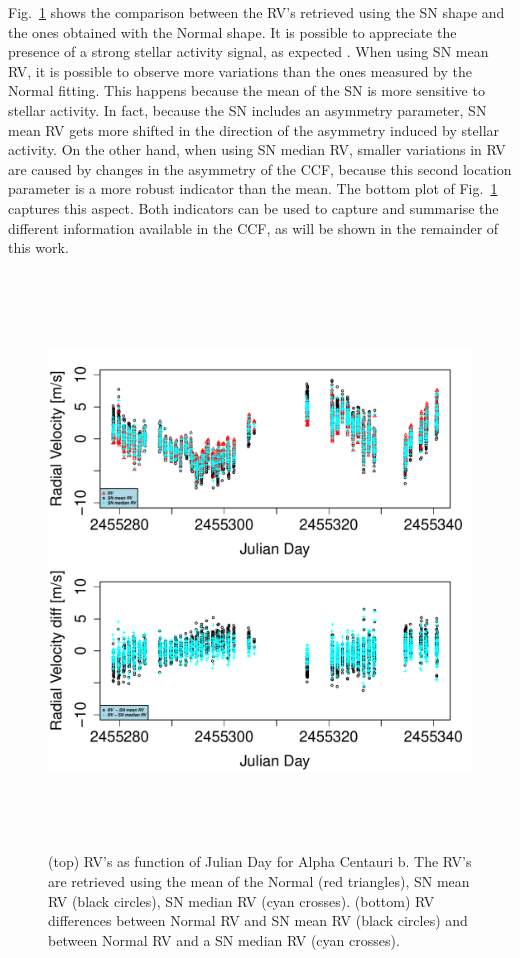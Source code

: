 \documentclass[11pt, oneside]{article}
\begin{document}
Fig.~\ref{fig:alphacent:diff:RV} shows the comparison between the RV's retrieved using the SN shape and the ones obtained with the Normal shape. It is possible to appreciate the presence of a strong stellar activity signal, as expected \citep{Dumusque-2012,Thompson-2017}. When using SN mean RV, it is possible to observe more variations than the ones measured by the Normal fitting. This happens because the mean of the SN is more sensitive to stellar activity. In fact, because the SN includes an asymmetry parameter, SN mean RV gets more shifted in the direction of the asymmetry induced by stellar activity. On the other hand, when using SN median RV, smaller variations in RV are caused by changes in the asymmetry of the CCF, because this second location parameter is a more robust indicator than the mean. The bottom plot of Fig.~\ref{fig:alphacent:diff:RV} captures this aspect. Both indicators can be used to capture and summarise the different information available in the CCF, as will be shown in the remainder of this work.
%
\begin{figure}[htbp]
   \centering
\includegraphics[height = 6in]{HD12862_[2]RadialVelocityDifferences.pdf} 
   \caption{(top) RV's as function of Julian Day for Alpha Centauri b. The RV's are retrieved using the mean of the Normal (red triangles), SN mean RV (black circles), SN median RV (cyan crosses). (bottom) RV differences between Normal RV and SN mean RV (black circles) and between Normal RV and a SN median RV (cyan crosses).}
   \label{fig:alphacent:diff:RV}
\end{figure}
%
\end{document}

